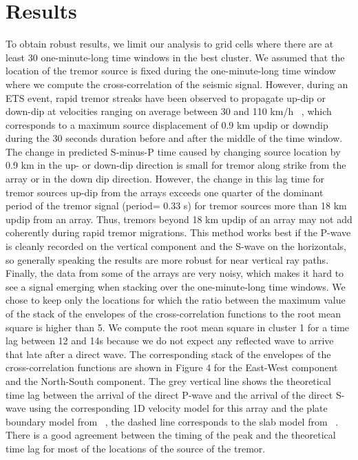 \documentclass[draft]{agujournal2019}
\begin{document}
\section{Results}

To obtain robust results, we limit our analysis to grid cells where there are at least 30 one-minute-long time windows in the best cluster. We assumed that the location of the tremor source is fixed during the one-minute-long time window where we compute the cross-correlation of the seismic signal. However, during an ETS event, rapid tremor streaks have been observed to propagate up-dip or down-dip at velocities ranging on average between 30 and 110 km/h ~\cite{GHO_2010_G3}, which corresponds to a maximum source displacement of 0.9 km updip or downdip during the 30 seconds duration before and after the middle of the time window. The change in predicted S-minus-P time caused by changing source location by 0.9 km in the up- or down-dip direction is small for tremor along strike from the array or in the down dip direction.  However, the change in this lag time for tremor sources up-dip from the arrays exceeds one quarter of the dominant period of the tremor signal (period= 0.33 s) for tremor sources more than 18 km updip from an array. Thus, tremors beyond 18 km updip of an array may not add coherently during rapid tremor migrations. This method works best if the P-wave is cleanly recorded on the vertical component and the S-wave on the horizontals, so generally speaking the results are more robust for near vertical ray paths. \\

Finally, the data from some of the arrays are very noisy, which makes it hard to see a signal emerging when stacking over the one-minute-long time windows. We chose to keep only the locations for which the ratio between the maximum value of the stack of the envelopes of the cross-correlation functions to the root mean square is higher than 5. We compute the root mean square in cluster 1 for a time lag between 12 and 14s because we do not expect any reflected wave to arrive that late after a direct wave. The corresponding stack of the envelopes of the cross-correlation functions are shown in Figure 4 for the East-West component and the North-South component. The grey vertical line shows the theoretical time lag between the arrival of the direct P-wave and the arrival of the direct S-wave using the corresponding 1D velocity model for this array and the plate boundary model from ~, the dashed line corresponds to the slab model from ~. There is a good agreement between the timing of the peak and the theoretical time lag for most of the locations of the source of the tremor. \\
\end{document}
